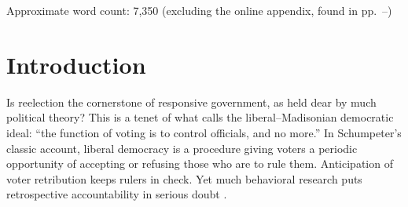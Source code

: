 \documentclass[letter,12pt]{article}
\begin{document}
\noindent Approximate word count: 7,350 (excluding the online appendix, found in pp.~\pageref{appendix}--\pageref{T:regs}) 




\doublespacing

\section{Introduction}

Is reelection the cornerstone of responsive government, as held dear by much political theory? This is a tenet of what \citet[][:9]{riker.lib.pop.1978} calls the liberal--Madisonian democratic ideal: ``the function of voting is to control officials, and no more.'' In Schumpeter's \citeyearpar{schumpeter.1942} classic account, liberal democracy is a procedure giving voters a periodic opportunity of accepting or refusing those who are to rule them. Anticipation of voter retribution keeps rulers in check. Yet much behavioral research puts retrospective accountability in serious doubt \citep{achen.bartels.Dem.real.2016}.
\end{document}
